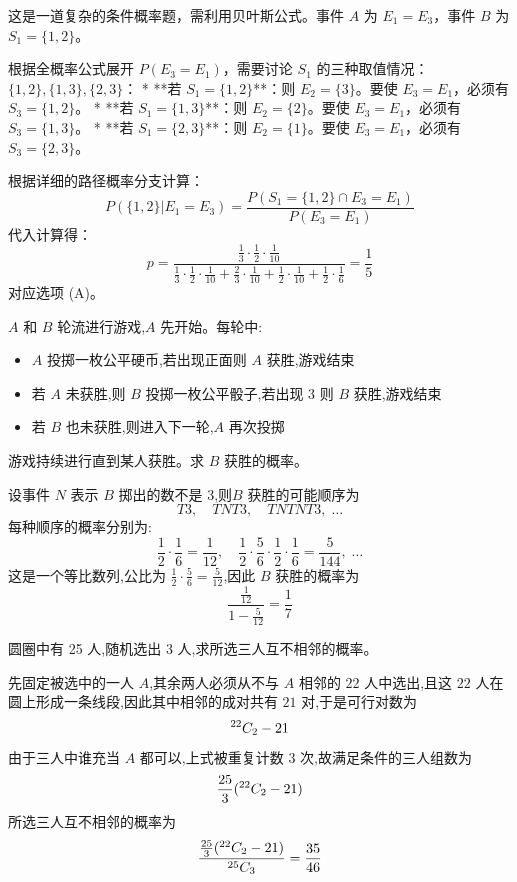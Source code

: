 \begin{questions}
\begin{solution}
这是一道复杂的条件概率题，需利用贝叶斯公式。事件 $A$ 为 $E_1=E_3$，事件 $B$ 为 $S_1=\{1,2\}$。

根据全概率公式展开 $P(E_3=E_1)$，需要讨论 $S_1$ 的三种取值情况：$\{1,2\}, \{1,3\}, \{2,3\}$：
* **若 $S_1=\{1,2\}$**：则 $E_2=\{3\}$。要使 $E_3=E_1$，必须有 $S_3=\{1,2\}$。
* **若 $S_1=\{1,3\}$**：则 $E_2=\{2\}$。要使 $E_3=E_1$，必须有 $S_3=\{1,3\}$。
* **若 $S_1=\{2,3\}$**：则 $E_2=\{1\}$。要使 $E_3=E_1$，必须有 $S_3=\{2,3\}$。

根据详细的路径概率分支计算：
\[ P(\{1,2\} | E_1=E_3) = \frac{P(S_1=\{1,2\} \cap E_3=E_1)}{P(E_3=E_1)} \]
代入计算得：
\[ p = \frac{\frac{1}{3} \cdot \frac{1}{2} \cdot \frac{1}{10}}{\frac{1}{3} \cdot \frac{1}{2} \cdot \frac{1}{10} + \frac{2}{3} \cdot \frac{1}{10} + \frac{1}{2} \cdot \frac{1}{10} + \frac{1}{2} \cdot \frac{1}{6}} = \frac{1}{5} \]
对应选项 (A)。
\end{solution}

    \question $A$ 和 $B$ 轮流进行游戏,$A$ 先开始。每轮中:
    \begin{itemize}
        \item $A$ 投掷一枚公平硬币,若出现正面则 $A$ 获胜,游戏结束
        \item 若 $A$ 未获胜,则 $B$ 投掷一枚公平骰子,若出现 3 则 $B$ 获胜,游戏结束
        \item 若 $B$ 也未获胜,则进入下一轮,$A$ 再次投掷
    \end{itemize}
    游戏持续进行直到某人获胜。求 $B$ 获胜的概率。
    \begin{solution}
        设事件 $N$ 表示 $B$ 掷出的数不是 3,则$B$ 获胜的可能顺序为
        \[
        T3, \quad TNT3, \quad TNTNT3, \;\ldots
        \]
        每种顺序的概率分别为:
        \[
        \frac{1}{2}\cdot \frac{1}{6} = \frac{1}{12},\quad
        \frac{1}{2}\cdot\frac{5}{6}\cdot\frac{1}{2}\cdot \frac{1}{6} = \frac{5}{144}, \;\ldots
        \]
        这是一个等比数列,公比为 $\displaystyle \frac{1}{2}\cdot \frac{5}{6}=\frac{5}{12}$,因此 $B$ 获胜的概率为
        \[
        \frac{\frac{1}{12}}{1 - \frac{5}{12}} = \frac{1}{7}
        \]
    \end{solution}

    \question 圆圈中有 25 人,随机选出 3 人,求所选三人互不相邻的概率。
    \begin{solution}
        先固定被选中的一人 $A$,其余两人必须从不与 $A$ 相邻的 $22$ 人中选出,且这 $22$ 人在圆上形成一条线段,因此其中相邻的成对共有 $21$ 对,于是可行对数为
        \[
        {}^{22}C_{2}-21
        \]
        由于三人中谁充当 $A$ 都可以,上式被重复计数 $3$ 次,故满足条件的三人组数为
        \[
        \frac{25}{3}({}^{22}C_{2}-21)
        \]
        所选三人互不相邻的概率为
        \[
        \frac{\frac{25}{3}({}^{22}C_{2}-21)}{{}^{25}C_{3}}=\frac{35}{46}
        \]
    \end{solution}


\end{questions}
